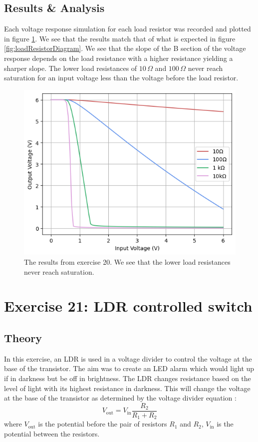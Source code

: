 \documentclass[%
reprint,
amsmath,amssymb,
aps,
floatfix
]{revtex4-2}
\begin{document}
		\subsection{Results \& Analysis}
		
		Each voltage response simulation for each load resistor was recorded and plotted in figure \ref{fig:ex20Results}. We see that the results match that of what is expected in figure \ref{fig:loadResistorDiagram}. We see that the slope of the B section of the voltage response depends on the load resistance with a higher resistance yielding a sharper slope. The lower load resistances of $10\,\Omega$ and $100\,\Omega$ never reach saturation for an input voltage less than the voltage before the load resistor.
		
		\begin{figure}
			\includegraphics[width=0.85\columnwidth]{ex20Results}
			\caption{\label{fig:ex20Results}The results from exercise 20. We see that the lower load resistances never reach saturation.}
		\end{figure}
		
	\section{Exercise 21: LDR controlled switch}
		\subsection{Theory}
		In this exercise, an LDR is used in a voltage divider to control the voltage at the base of the transistor. The aim was to create an LED alarm which would light up if in darkness but be off in brightness. The LDR changes resistance based on the level of light with its highest resistance in darkness. This will change the voltage at the base of the transistor as determined by the voltage divider equation \cite{seeed}:
		\begin{equation}
			V_\text{out} = V_\text{in} \frac{R_2}{R_1 + R_2}
			\label{eq:voltageDivider}
		\end{equation}where $V_\text{out}$ is the potential before the pair of resistors $R_1$ and $R_2$, $V_\text{in}$ is the potential between the resistors.
		
\end{document}
